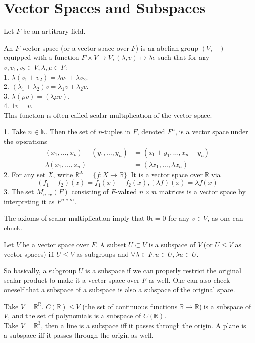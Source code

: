 \section{Vector Spaces and Subspaces}
Let $F$ be an arbitrary field.
\begin{definition}
    An $F$-vector space (or a vector space over $F$) is an abelian group $(V,+)$ equipped with a function $F\times V\to V,(\lambda,v)\mapsto \lambda v$ such that for any $v,v_1,v_2\in V,\lambda,\mu\in F$:\\
    1. $\lambda(v_1+v_2)=\lambda v_1+\lambda v_2$.\\
    2. $(\lambda_1+\lambda_2)v=\lambda_1v+\lambda_2v$.\\
    3. $\lambda(\mu v)=(\lambda\mu v)$.\\
    4. $1v=v$.\\
    This function is often called scalar multiplication of the vector space.
\end{definition}
\begin{example}
    1. Take $n\in\mathbb N$.
    Then the set of $n$-tuples in $F$, denoted $F^n$, is a vector space under the operations
    \begin{align*}
        (x_1,\ldots,x_n)+(y_1,\ldots,y_n)&=(x_1+y_1,\ldots,x_n+y_n)\\
        \lambda(x_1,\ldots,x_n)&=(\lambda x_1,\ldots,\lambda x_n)
    \end{align*}
    2. For any set $X$, write $\mathbb R^X=\{f:X\to\mathbb R\}$.
    It is a vector space over $\mathbb R$ via
    $$(f_1+f_2)(x)=f_1(x)+f_2(x),(\lambda f)(x)=\lambda f(x)$$
    3. The set $M_{n,m}(F)$ consisting of $F$-valued $n\times m$ matrices is a vector space by interpreting it as $F^{n\times m}$.
\end{example}
\begin{remark}
    The axioms of scalar multiplication imply that $0v=0$ for any $v\in V$, as one can check.
\end{remark}
\begin{definition}[Subspace]
    Let $V$ be a vector space over $F$.
    A subset $U\subset V$ is a subspace of $V$ (or $U\le V$ as vector spaces) iff $U\le V$ as subgroups and $\forall\lambda\in F,u\in U,\lambda u\in U$.
\end{definition}
So basically, a subgroup $U$ is a subspace if we can properly restrict the original scalar product to make it a vector space over $F$ as well.
One can also check oneself that a subspace of a subspace is also a subspace of the original space.
\begin{example}
    Take $V=\mathbb R^{\mathbb R}$.
    $C(\mathbb R)\le V$ (the set of continuous functions $\mathbb R\to\mathbb R$) is a subspace of $V$, and the set of polynomials is a subspace of $C(\mathbb R)$.\\
    Take $V=\mathbb R^3$, then a line is a subspace iff it passes through the origin.
    A plane is a subspace iff it passes through the origin as well.
\end{example}
